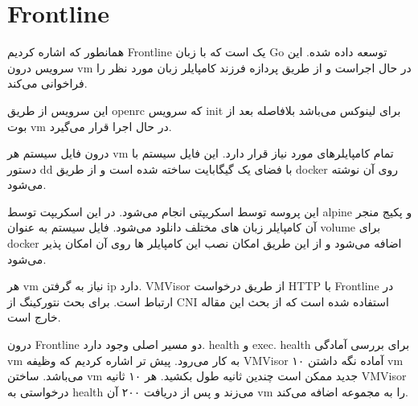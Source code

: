 \section{Frontline}

همانطور که اشاره کردیم Frontline یک  است که با زبان Go توسعه داده شده.
این سرویس درون vm در حال اجراست و از طریق پردازه فرزند کامپایلر زبان مورد نظر را فراخوانی می‌کند.

این سرویس از طریق openrc که سرویس init برای لینوکس می‌باشد بلافاصله بعد از بوت vm در حال اجرا قرار می‌گیرد.

درون فایل سیستم هر vm تمام کامپایلرهای مورد نیاز قرار دارد.
این فایل سیستم با دستور dd با فضای یک گیگابایت ساخته شده است
و از طریق docker روی آن نوشته می‌شود.

این پروسه توسط اسکریپتی انجام می‌شود. در این اسکریپت توسط alpine و پکیج منجر آن کامپایلر زبان های مختلف دانلود می‌شود.
فایل سیستم به عنوان volume برای docker اضافه می‌شود و از این طریق امکان نصب این کامپایلر ها روی آن امکان پذیر می‌شود.

هر vm نیاز به گرفتن ip دارد. VMVisor از طریق درخواست HTTP با Frontline در ارتباط است.
برای بحث نتورکینگ از CNI استفاده شده است که از بحث این مقاله خارج است.

درون Frontline دو مسیر اصلی وجود دارد.
health و exec. health برای بررسی آمادگی vm به کار می‌رود.
پیش تر اشاره کردیم که وظیفه VMVisor آماده نگه داشتن ۱۰ vm می‌باشد.
ساختن vm جدید ممکن است چندین ثانیه طول بکشید. هر ۱۰ ثانیه VMVisor درخواستی به health می‌زند و پس از دریافت ۲۰۰ آن vm را به مجموعه اضافه می‌کند.

